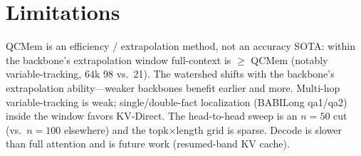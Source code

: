 \documentclass[11pt]{article}
\begin{document}
\section{Limitations}
QCMem is an efficiency / extrapolation method, not an accuracy SOTA: within the
backbone's extrapolation window full-context is $\ge$ QCMem (notably
variable-tracking, 64k 98 vs.\ 21). The watershed shifts with the backbone's
extrapolation ability---weaker backbones benefit earlier and more. Multi-hop
variable-tracking is weak; single/double-fact localization (BABILong qa1/qa2)
inside the window favors KV-Direct. The head-to-head sweep is an $n{=}50$ cut
(vs.\ $n{=}100$ elsewhere) and the topk$\times$length grid is sparse. Decode is
slower than full attention and is future work (resumed-band KV cache).



\end{document}
